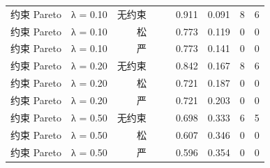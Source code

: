 {\begin{longtable}{llrrrrrrr}
约束 Pareto & λ = 0.10 & 无约束 &  &  & 0.911 & 0.091 & 8 & 6 \\
约束 Pareto & λ = 0.10 & 松 &  &  & 0.773 & 0.119 & 0 & 0 \\
约束 Pareto & λ = 0.10 & 严 &  &  & 0.773 & 0.141 & 0 & 0 \\
约束 Pareto & λ = 0.20 & 无约束 &  &  & 0.842 & 0.167 & 8 & 6 \\
约束 Pareto & λ = 0.20 & 松 &  &  & 0.721 & 0.187 & 0 & 0 \\
约束 Pareto & λ = 0.20 & 严 &  &  & 0.721 & 0.203 & 0 & 0 \\
约束 Pareto & λ = 0.50 & 无约束 &  &  & 0.698 & 0.333 & 6 & 5 \\
约束 Pareto & λ = 0.50 & 松 &  &  & 0.607 & 0.346 & 0 & 0 \\
约束 Pareto & λ = 0.50 & 严 &  &  & 0.596 & 0.354 & 0 & 0 \\
\end{longtable}
}
